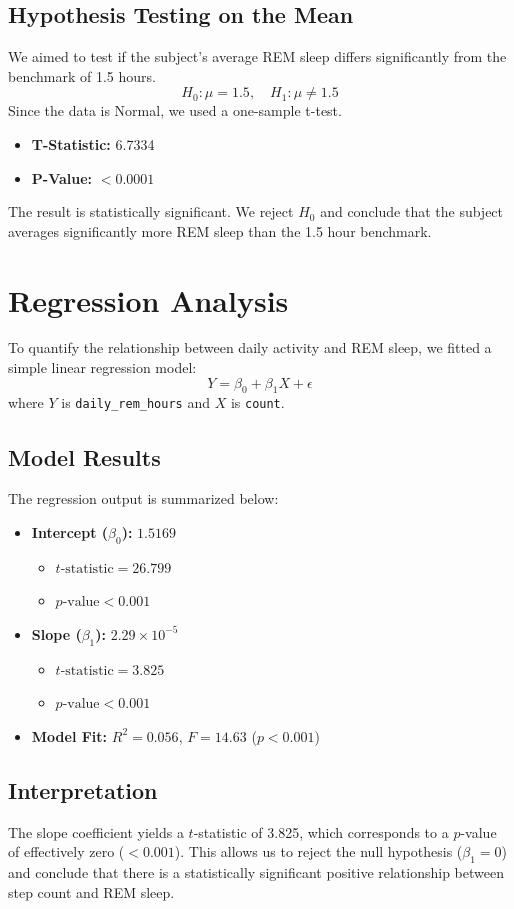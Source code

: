 \documentclass[conference]{IEEEtran}
\begin{document}
\subsection{Hypothesis Testing on the Mean}
We aimed to test if the subject's average REM sleep differs significantly from the benchmark of 1.5 hours.
\[ H_0: \mu = 1.5, \quad H_1: \mu \neq 1.5 \]
Since the data is Normal, we used a one-sample t-test.
\begin{itemize}
    \item \textbf{T-Statistic:} 6.7334
    \item \textbf{P-Value:} $< 0.0001$
\end{itemize}
The result is statistically significant. We reject $H_0$ and conclude that the subject averages significantly more REM sleep than the 1.5 hour benchmark.

\section{Regression Analysis}
To quantify the relationship between daily activity and REM sleep, we fitted a simple linear regression model:
\[ Y = \beta_0 + \beta_1 X + \epsilon \]
where $Y$ is \texttt{daily\_rem\_hours} and $X$ is \texttt{count}.

\subsection{Model Results}
The regression output is summarized below:
\begin{itemize}
    \item \textbf{Intercept ($\beta_0$):} $1.5169$
    \begin{itemize}
        \item $t\text{-statistic} = 26.799$
        \item $p\text{-value} < 0.001$
    \end{itemize}
    \item \textbf{Slope ($\beta_1$):} $2.29 \times 10^{-5}$
    \begin{itemize}
        \item $t\text{-statistic} = 3.825$
        \item $p\text{-value} < 0.001$
    \end{itemize}
    \item \textbf{Model Fit:} $R^2 = 0.056$, $F = 14.63$ ($p < 0.001$)
\end{itemize}

\subsection{Interpretation}
The slope coefficient yields a $t$-statistic of 3.825, which corresponds to a $p$-value of effectively zero ($< 0.001$). This allows us to reject the null hypothesis ($\beta_1 = 0$) and conclude that there is a statistically significant positive relationship between step count and REM sleep.
\end{document}
